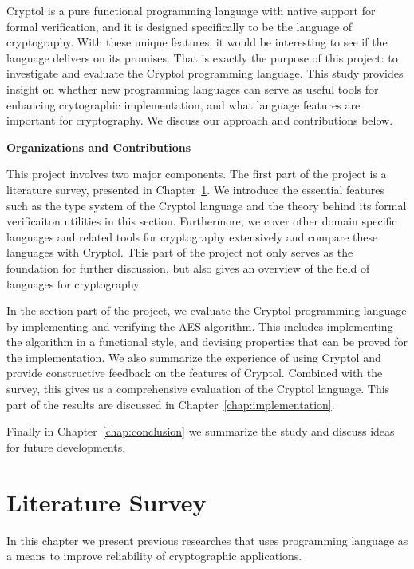\documentclass[a4paper, notitlepage]{report}
\renewcommand{\paragraph}[1]{\vspace*{1em}\noindent\textbf{#1}\hspace*{1em}}
\begin{document}
Cryptol is a pure functional programming language with native support for
formal verification, and it is designed specifically to be the language of
cryptography. With these unique features, it would be interesting to see if
the language delivers on its promises. That is exactly the purpose of this
project: to investigate and evaluate the Cryptol programming language.
This study provides insight on whether new programming languages can serve
as useful tools for enhancing crytographic implementation, and what language
features are important for cryptography.
We discuss our approach and contributions below.

\paragraph{Organizations and Contributions}

This project involves two major components. The first part of the project
is a literature survey, presented in Chapter~\ref{chap:survey}.
We introduce the essential features such as the type system of the Cryptol language
and the theory behind its formal verificaiton utilities in this section.
Furthermore, we cover other domain specific languages and related tools for
cryptography extensively and compare these languages with Cryptol.
This part of the project not only serves as the foundation for further discussion,
but also gives an overview of the field of languages for cryptography.

In the section part of the project, we evaluate the Cryptol programming language
by implementing and verifying the AES algorithm. This includes implementing the
algorithm in a functional style, and devising properties that can be proved
for the implementation. We also summarize the experience of using Cryptol
and provide constructive feedback on the features of Cryptol. Combined with the survey,
this gives us a comprehensive evaluation of the Cryptol language.
This part of the results are discussed in Chapter~\ref{chap:implementation}.

Finally in Chapter~\ref{chap:conclusion} we summarize the study and discuss
ideas for future developments.




\newpage
\chapter{Literature Survey}
\label{chap:survey}

In this chapter we present previous researches that uses programming
language as a means to improve reliability of cryptographic applications.
\end{document}
